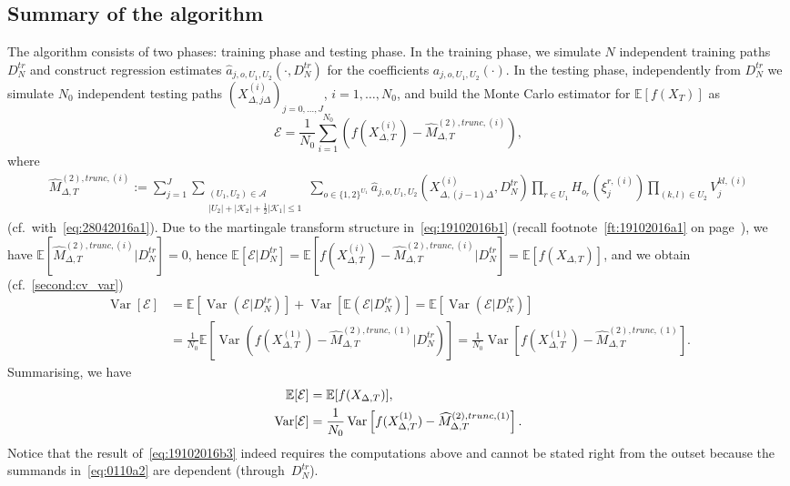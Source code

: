 \documentclass[11pt,a4paper]{amsart}
\theoremstyle{plain}
\theoremstyle{definition}
\theoremstyle{remark}
\numberwithin{equation}{section}
\newcommand*{\Var}{\operatorname{Var}}
\newcommand*{\EE}{\mathbb E}
\newcommand*{\cA}{\mathcal A}
\renewcommand*{\doteq}{:=}
\begin{document}
\subsection{Summary of the algorithm}
The algorithm consists of two phases:
training phase and testing phase.
In the training phase, we simulate
$N$ independent training paths $D_N^{tr}$
and construct regression estimates
$\hat a_{j,o,U_1,U_2}(\cdot,D_N^{tr})$
for the coefficients $a_{j,o,U_1,U_2}(\cdot)$.
In the testing phase,
independently from $D_N^{tr}$
we simulate $N_0$ independent testing paths
$(X_{\Delta,j\Delta}^{(i)})_{j=0,\ldots,J}$,
$i=1,\ldots,N_0$,
and build the Monte Carlo estimator
for $\EE[f(X_T)]$ as
\begin{equation}
\label{eq:0110a2}
\mathcal E=
\frac1{N_0}
\sum_{i=1}^{N_0}
\left(f(X^{(i)}_{\Delta,T})-\widehat M^{(2),trunc,(i)}_{\Delta,T}\right),
\end{equation}
where
\begin{align}\label{eq:19102016b1}
\widehat{M}^{(2),trunc,(i)}_{\Delta,T}\doteq\sum_{j=1}^J
\sum_{\substack{(U_1,U_2)\in\cA\\ \left|U_2\right|+\left|\mathcal{K}_2\right|+\frac{1}{2}\left|\mathcal{K}_1\right|\le 1}}
\sum_{o\in\{1,2\}^{U_1}}
\hat{a}_{j,o,U_1,U_2}(X^{(i)}_{\Delta,(j-1)\Delta},D_N^{tr})
\prod_{r\in U_1} H_{o_r}(\xi_j^{r,(i)})
\prod_{(k,l)\in U_2} V_j^{kl,(i)}
\end{align}
(cf.\ with~\eqref{eq:28042016a1}).
Due to the martingale transform structure
in~\eqref{eq:19102016b1}
(recall footnote~\ref{ft:19102016a1}
on page~\pageref{ft:19102016a1}),
we have
$\EE\left[\widehat M^{(2),trunc,(i)}_{\Delta,T}|D^{tr}_N\right]=0$,
hence
$\EE[\mathcal E|D^{tr}_N]
=\EE[f(X^{(i)}_{\Delta,T})-\widehat M^{(2),trunc,(i)}_{\Delta,T}|D^{tr}_N]
=\EE[f(X_{\Delta,T})]$,
and we obtain (cf.~\eqref{second:cv_var})
\begin{align*}
\Var[\mathcal E]
&=\EE[\Var(\mathcal E|D^{tr}_N)]
+\Var[\EE(\mathcal E|D^{tr}_N)]
=\EE[\Var(\mathcal E|D^{tr}_N)]\\
&=\frac1{N_0}
\EE\left[\Var\left(f(X^{(1)}_{\Delta,T})-\widehat M^{(2),trunc,(1)}_{\Delta,T}|D^{tr}_N\right)\right]
=\frac1{N_0}
\Var\left[f(X^{(1)}_{\Delta,T})-\widehat M^{(2),trunc,(1)}_{\Delta,T}\right].
\end{align*}
Summarising, we have
\begin{align}
\EE[\mathcal E]&=\EE[f(X_{\Delta,T})],
\notag\\
\Var[\mathcal E]&=\frac1{N_0}
\Var\left[f(X^{(1)}_{\Delta,T})-\widehat M^{(2),trunc,(1)}_{\Delta,T}\right].
\label{eq:19102016b3}
\end{align}
Notice that the result of~\eqref{eq:19102016b3}
indeed requires the computations above
and cannot be stated right from the outset
because the summands in~\eqref{eq:0110a2}
are dependent (through~$D^{tr}_N$).
\end{document}
